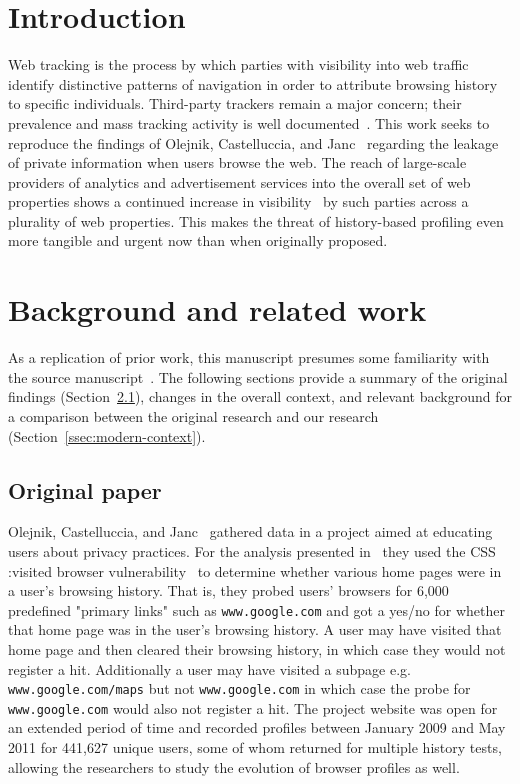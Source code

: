 \documentclass[letterpaper,twocolumn,10pt]{article}
\begin{document}
\section{Introduction}
\label{sec:intro}
Web tracking is the process by which parties with visibility into web traffic identify distinctive patterns of navigation in order to attribute browsing history to specific individuals. 
Third-party trackers remain a major concern; their prevalence and mass tracking activity is well documented~\cite{zeberwww2020, 10.1145/3178876.3186097, 8270427}. 
This work seeks to reproduce the findings of Olejnik, Castelluccia, and Janc~\cite{olejnikWhyJohnnyCan2012} regarding the leakage of private information when users browse the web. 
The reach of large-scale providers of analytics and advertisement services into the overall set of web properties shows a continued increase in visibility~\cite{zeberwww2020} by such parties across a plurality of web properties.
This makes the threat of history-based profiling even more tangible and urgent now than when originally proposed.
%
\section{Background and related work}
\label{sec:background}
As a replication of prior work, this manuscript presumes some familiarity with the source manuscript~\cite{olejnikWhyJohnnyCan2012}. 
The following sections provide a summary of the original findings (Section~\ref{ssec:original}), changes in the overall context, and relevant background for a comparison between the original research and our research (Section~\ref{ssec:modern-context}).

\subsection{Original paper}
\label{ssec:original}
Olejnik, Castelluccia, and Janc~\cite{olejnikWhyJohnnyCan2012} gathered data in a project aimed at educating users about privacy practices. 
For the analysis presented in~\cite{olejnikWhyJohnnyCan2012} they used the CSS :visited browser vulnerability~\cite{mozilla147777VisitedSupport2005} to determine whether various home pages were in a user's browsing history. 
That is, they probed users' browsers for 6,000 predefined "primary links" such as \texttt{www.google.com} and got a yes/no for whether that home page was in the user's browsing history. 
A user may have visited that home page and then cleared their browsing history, in which case they would not register a hit. 
Additionally a user may have visited a subpage e.g. \texttt{www.google.com/maps} but not \texttt{www.google.com} in which case the probe for \texttt{www.google.com} would also not register a hit.
The project website was open for an extended period of time and recorded profiles between January 2009 and May 2011 for 441,627 unique users, some of whom returned for multiple history tests, allowing the researchers to study the evolution of browser profiles as well.
\end{document}
